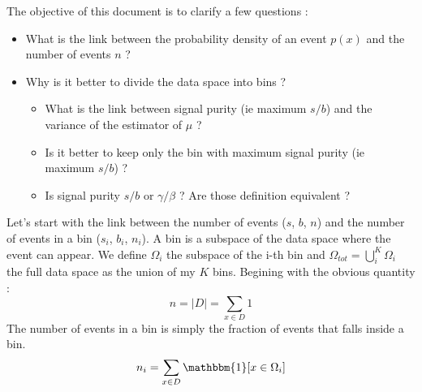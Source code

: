 The objective of this document is to clarify a few questions :
\begin{itemize}
	\item What is the link between the probability density of an event $p(x)$ and the number of events $n$ ?
	\item Why is it better to divide the data space into bins ?
	\begin{itemize}
		\item What is the link between signal purity (ie maximum $s/b$) and the variance of the estimator of $\mu$ ?
		\item Is it better to keep only the bin with maximum signal purity (ie maximum $s/b$) ?
		\item Is signal purity $s/b$ or $\gamma / \beta$ ? Are those definition equivalent ?
	\end{itemize}
\end{itemize}



Let's start with the link between the number of events ($s$, $b$, $n$) and the number of events in a bin ($s_i$, $b_i$, $n_i$).
A bin is a subspace of the data space where the event can appear.
We define $\Omega_i$ the subspace of the i-th bin and $\Omega_{tot} = \bigcup_i^K \Omega_i $ the full data space as the union of my $K$ bins.
Begining with the obvious quantity :
\begin{equation}
	n = |D| = \sum_{x\in D} 1
\end{equation}
The number of events in a bin is simply the fraction of events that falls inside a bin.
\begin{equation}
	n_i = \sum_{x\in D} \mathbbm{1} [x\in \Omega_i]
\end{equation}




